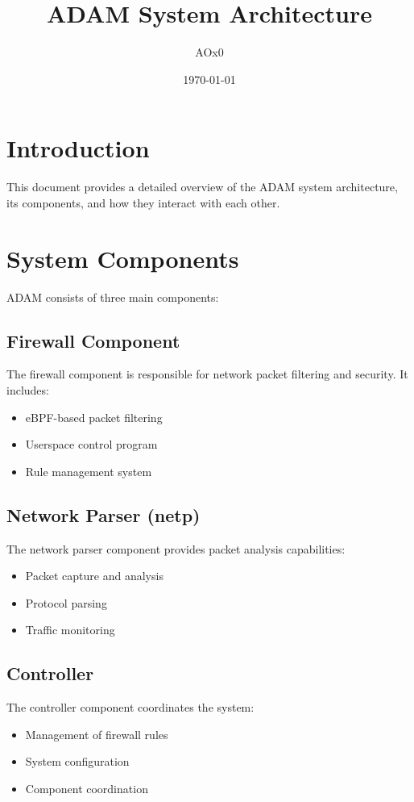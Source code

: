 \documentclass{article}
\title{ADAM System Architecture}
\author{AOx0}
\date{\today}
\begin{document}
\maketitle

\section{Introduction}
This document provides a detailed overview of the ADAM system architecture, its components, and how they interact with each other.

\section{System Components}
ADAM consists of three main components:

\subsection{Firewall Component}
The firewall component is responsible for network packet filtering and security. It includes:
\begin{itemize}
    \item eBPF-based packet filtering
    \item Userspace control program
    \item Rule management system
\end{itemize}

\subsection{Network Parser (netp)}
The network parser component provides packet analysis capabilities:
\begin{itemize}
    \item Packet capture and analysis
    \item Protocol parsing
    \item Traffic monitoring
\end{itemize}

\subsection{Controller}
The controller component coordinates the system:
\begin{itemize}
    \item Management of firewall rules
    \item System configuration
    \item Component coordination
\end{itemize}
\end{document}
